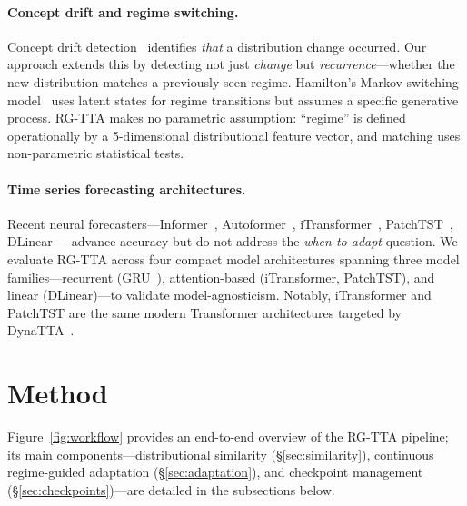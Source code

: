 \documentclass[11pt,a4paper]{article}
\begin{document}
\paragraph{Concept drift and regime switching.}
Concept drift detection~\citep{gama2014concept,lu2018concept,aminikhanghahi2017survey} identifies \emph{that} a distribution change occurred. Our approach extends this by detecting not just \emph{change} but \emph{recurrence}---whether the new distribution matches a previously-seen regime. Hamilton's Markov-switching model~\citep{hamilton1989} uses latent states for regime transitions but assumes a specific generative process. RG-TTA makes no parametric assumption: ``regime'' is defined operationally by a 5-dimensional distributional feature vector, and matching uses non-parametric statistical tests.

\paragraph{Time series forecasting architectures.}
Recent neural forecasters---Informer~\citep{zhou2021informer}, Autoformer~\citep{wu2021autoformer}, iTransformer~\citep{liu2024itransformer}, PatchTST~\citep{nie2023patchtst}, DLinear~\citep{zeng2023dlinear}---advance accuracy but do not address the \emph{when-to-adapt} question. We evaluate RG-TTA across four compact model architectures spanning three model families---recurrent (GRU~\citep{cho2014gru}), attention-based (iTransformer, PatchTST), and linear (DLinear)---to validate model-agnosticism. Notably, iTransformer and PatchTST are the same modern Transformer architectures targeted by DynaTTA~\citep{grover2025dynatta}.


\section{Method}
\label{sec:method}

Figure~\ref{fig:workflow} provides an end-to-end overview of the RG-TTA pipeline; its main components---distributional similarity (\S\ref{sec:similarity}), continuous regime-guided adaptation (\S\ref{sec:adaptation}), and checkpoint management (\S\ref{sec:checkpoints})---are detailed in the subsections below.
\end{document}
